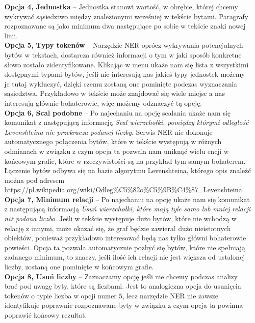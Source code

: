 \documentclass[12pt, a4paper]{article}
\begin{document}
\noindent\textbf{Opcja 4, Jednostka} -- Jednostka stanowi wartość, w obrębie, której chcemy wykrywać sąsiedztwo między znalezionymi wcześniej w tekście bytami. Paragrafy rozpoznawane są jako minimum dwa następujące po sobie w tekście znaki nowej linii.\\

\noindent\textbf{Opcja 5, Typy tokenów} -- Narzędzie NER oprócz wykrywania potencjalnych bytów w tekstach, dostarcza również informacji o tym w jaki sposób konkretne słowo zostało zidentyfikowane. Klikając w menu ukaże nam się lista z wszystkimi dostępnymi typami bytów, jeśli nie interesują nas jakieś typy jednostek możemy je tutaj wykluczyć, dzięki czemu zostaną one pominięte podczas wyznaczania sąsiedztwa. Przykładowo w tekście może znajdować się wiele miejsc a nas interesują głównie bohaterowie, więc możemy odznaczyć tą opcję.\\

\noindent\textbf{Opcja 6, Scal podobne} -- Po najechaniu na opcję scalania ukaże nam się komunikat z następującą informacją \textit{Scal wierzchołki, pomiędzy którymi odległość Levenshteina nie przekracza podanej liczby.} Serwis NER nie dokonuje automatycznego połączenia bytów, które w tekście występują w różnych odmianach w związku z czym opcja ta pozwala nam uniknąć wielu encji w końcowym grafie, które w rzeczywistości są na przykład tym samym bohaterem. Łączenie bytów odbywa się na bazie algorytmu Levenshteina, którego opis znaleźć można pod adresem \url{https://pl.wikipedia.org/wiki/Odleg\%C5\%82o\%C5\%9B\%C4\%87_Levenshteina}.\\

\noindent\textbf{Opcja 7, Minimum relacji} -- Po najechaniu na opcję ukaże nam się komunikat z następującą informacją \textit{Usuń wierzchołki, które mają tyle samo lub mniej relacji niż podana liczba.} Jeśli w tekście występuje dużo bytów, które nie wchodzą w relację z innymi, może okazać się, że graf będzie zawierał dużo nieistotnych obiektów, ponieważ przykładowo interesować będą nas tylko główni bohaterowie powieści. Opcja ta pozwala automatycznie pozbyć się bytów, które nie spełniają zadanego minimum, to znaczy, jeśli ilość ich relacji nie jest większa od ustalonej liczby, zostaną one pominięte w końcowym grafie.\\

\noindent\textbf{Opcja 8, Usuń liczby} -- Zaznaczamy opcję jeśli nie chcemy podczas analizy brać pod uwagę byty, które są liczbami. Jest to analogiczna opcja do usunięcia tokenów o typie liczba w opcji numer $5$, lecz narzędzie NER nie zawsze identyfikuje poprawnie rozpoznawane byty w związku z czym opcja ta powinna poprawić końcowy rezultat.\\
\end{document}
